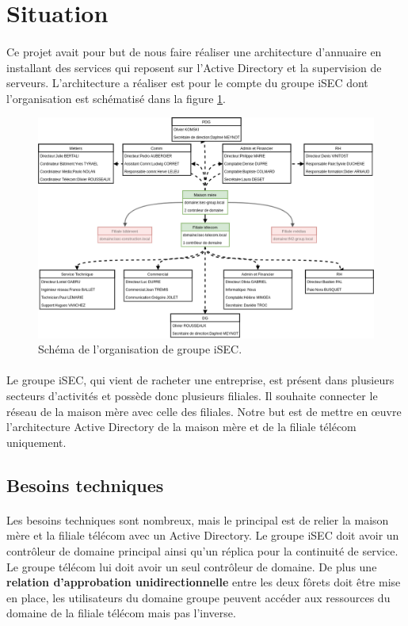 \section{Situation}
	\paragraph{}
		Ce projet avait pour but de nous faire réaliser une architecture d'annuaire en installant des services qui reposent sur l'Active Directory et la supervision de serveurs. L'architecture a réaliser est pour le compte du groupe iSEC dont l'organisation est schématisé dans la figure \ref{isec_orga}.

		\begin{figure}[h]
			\centering
			\includegraphics[scale=0.45]{Presentation/img/ISEC_orga.png}
			\caption{Schéma de l'organisation de groupe iSEC.}
			\label{isec_orga}
		\end{figure}
	\paragraph{}
		Le groupe iSEC, qui vient de racheter une entreprise, est présent dans plusieurs secteurs d'activités et possède donc plusieurs filiales. Il souhaite connecter le réseau de la maison mère avec celle des filiales. Notre but est de mettre en \oe{}uvre l'architecture Active Directory de la maison mère et de la filiale télécom uniquement.
	\subsection{Besoins techniques}
		\paragraph{}
			Les besoins techniques sont nombreux, mais le principal est de relier la maison mère et la filiale télécom avec un Active Directory. Le groupe iSEC doit avoir un contrôleur de domaine principal ainsi qu'un réplica pour la continuité de service. Le groupe télécom lui doit avoir un seul contrôleur de domaine. De plus une \textbf{relation d'approbation unidirectionnelle} entre les deux fôrets doit être mise en place, les utilisateurs du domaine groupe peuvent accéder aux ressources du domaine de la filiale télécom mais pas l'inverse.
